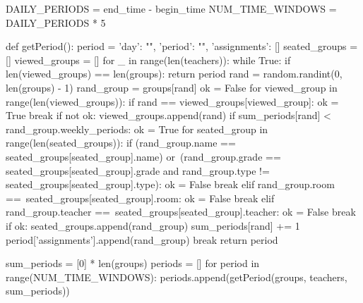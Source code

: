 \begin{python}
DAILY_PERIODS = end_time - begin_time
NUM_TIME_WINDOWS = DAILY_PERIODS * 5


def getPeriod():
    period = {'day': "", 'period': "", 'assignments': []}
    seated_groups = []
    viewed_groups = []
    for _ in range(len(teachers)):
        while True:
            if len(viewed_groups) == len(groups):
                return period
            rand = random.randint(0, len(groups) - 1)
            rand_group = groups[rand]
            ok = False
            for viewed_group in range(len(viewed_groups)):
                if rand == viewed_groups[viewed_group]:
                    ok = True
                    break
            if not ok:
                viewed_groups.append(rand)
                if sum_periods[rand] < rand_group.weekly_periods:
                    ok = True
                    for seated_group in range(len(seated_groups)):
                        if (rand_group.name ==
                           seated_groups[seated_group].name) or\
                           (rand_group.grade == 
                           seated_groups[seated_group].grade and
                           rand_group.type != 
                           seated_groups[seated_group].type):
                            ok = False
                            break
                        elif rand_group.room ==\
                           seated_groups[seated_group].room:
                            ok = False
                            break
                        elif rand_group.teacher ==\
                           seated_groups[seated_group].teacher:
                            ok = False
                            break
                    if ok:
                        seated_groups.append(rand_group)
                        sum_periods[rand] += 1
                        period['assignments'].append(rand_group)
                        break
    return period


sum_periods = [0] * len(groups)
    periods = []
    for period in range(NUM_TIME_WINDOWS):
        periods.append(getPeriod(groups, teachers, sum_periods))
\end{python}

